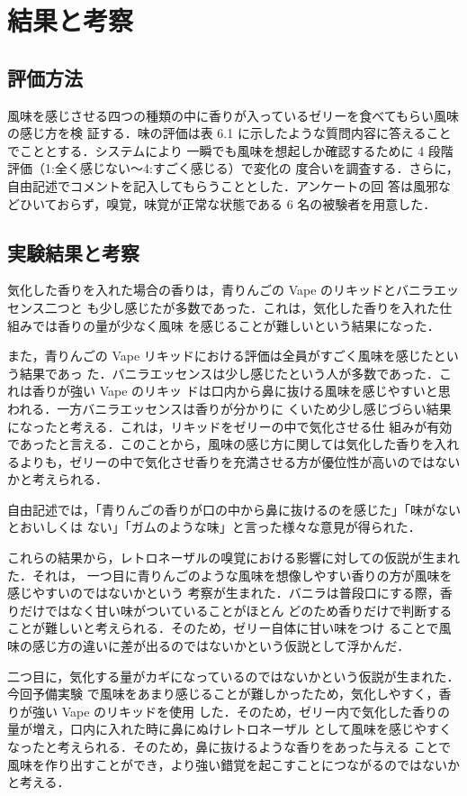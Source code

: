\section{結果と考察}

\subsection{評価方法}

風味を感じさせる四つの種類の中に香りが入っているゼリーを食べてもらい風味の感じ方を検
証する．味の評価は表 6.1 に示したような質問内容に答えることでこととする．システムにより
一瞬でも風味を想起しか確認するために 4 段階評価（1:全く感じない～4:すごく感じる）で変化の
度合いを調査する．さらに，自由記述でコメントを記入してもらうこととした．アンケートの回
答は風邪などひいておらず，嗅覚，味覚が正常な状態である 6 名の被験者を用意した．


\subsection{実験結果と考察}

気化した香りを入れた場合の香りは，青りんごの Vape のリキッドとバニラエッセンス二つと
も少し感じたが多数であった．これは，気化した香りを入れた仕組みでは香りの量が少なく風味
を感じることが難しいという結果になった．


また，青りんごの Vape リキッドにおける評価は全員がすごく風味を感じたという結果であっ
た．バニラエッセンスは少し感じたという人が多数であった．これは香りが強い Vape のリキッ
ドは口内から鼻に抜ける風味を感じやすいと思われる．一方バニラエッセンスは香りが分かりに
くいため少し感じづらい結果になったと考える．これは，リキッドをゼリーの中で気化させる仕
組みが有効であったと言える．このことから，風味の感じ方に関しては気化した香りを入れるよりも，ゼリーの中で気化させ香りを充満させる方が優位性が高いのではないかと考えられる．


自由記述では，「青りんごの香りが口の中から鼻に抜けるのを感じた」「味がないとおいしくは
ない」「ガムのような味」と言った様々な意見が得られた．


これらの結果から，レトロネーザルの嗅覚における影響に対しての仮説が生まれた．それは，
一つ目に青りんごのような風味を想像しやすい香りの方が風味を感じやすいのではないかという
考察が生まれた．バニラは普段口にする際，香りだけではなく甘い味がついていることがほとん
どのため香りだけで判断することが難しいと考えられる．そのため，ゼリー自体に甘い味をつけ
ることで風味の感じ方の違いに差が出るのではないかという仮説として浮かんだ．


二つ目に，気化する量がカギになっているのではないかという仮説が生まれた．今回予備実験
で風味をあまり感じることが難しかったため，気化しやすく，香りが強い Vape のリキッドを使用
した．そのため，ゼリー内で気化した香りの量が増え，口内に入れた時に鼻にぬけレトロネーザル
として風味を感じやすくなったと考えられる．そのため，鼻に抜けるような香りをあった与える
ことで風味を作り出すことができ，より強い錯覚を起こすことにつながるのではないかと考える．